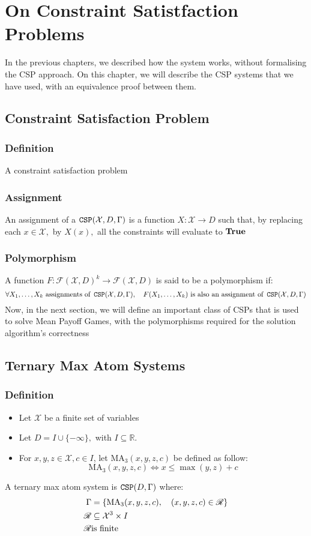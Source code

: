 \chapter{On Constraint Satistfaction Problems}
In the previous chapters, we described how the system works, without formalising the CSP approach.\newline
On this chapter, we will describe the CSP systems that we have used, with an equivalence proof between them.

\section{Constraint Satisfaction Problem}
\subsection{Definition}
A constraint satisfaction problem
\subsection{Assignment}
An assignment of a $\operatorname{\mathtt{CSP}}(\mathcal{X},D,\Gamma)$ is a function $X:\mathcal{X}\rightarrow D$ such that, by replacing each $x\in\mathcal{X},$ by $X(x),$ all the constraints will evaluate to $\operatorname{\textbf{True}}$
\subsection{Polymorphism}
A function $F:\mathscr{F}(\mathcal{X},D)^k\rightarrow \mathscr{F}(\mathcal{X},D)$ is said to be a polymorphism if:
$$
\forall X_1,\dots,X_k \ \text{assignments of}\ \CSP(\mathcal{X},D,\Gamma),\quad F(X_1,\dots,X_k) \ \text{is also an assignment of}\ \CSP(\mathcal{X},D,\Gamma)
$$
Now, in the next section, we will define an important class of CSPs that is used to solve Mean Payoff Games, with the polymorphisms required for the solution algorithm's correctness

\section{Ternary Max Atom Systems}
\subsection{Definition}
\begin{itemize}
	\item Let $\mathcal{X}$ be a finite set of variables
	\item Let $D=I\cup \{-\infty\},$ with $I\subseteq \mathbb{R}$.
	\item  For $x,y,z\in \mathcal{X},c\in I$, let $\text{MA}_3(x,y,z,c)$ be defined as follow:
	$$
	\text{MA}_3(x,y,z,c)\iff x\le \max(y,z)+c
	$$
\end{itemize}
A ternary max atom system is $\operatorname{\mathtt{CSP}}(D,\Gamma)$ where:
\begin{align*}
	\Gamma&=\left\{\text{MA}_3(x,y,z,c),\quad (x,y,z,c)\in \mathscr{R}\right\}\\
	\mathscr{R}&\subseteq \mathcal{X}^3\times I\\
	\mathscr{R}& \space \text{is finite}
\end{align*}
